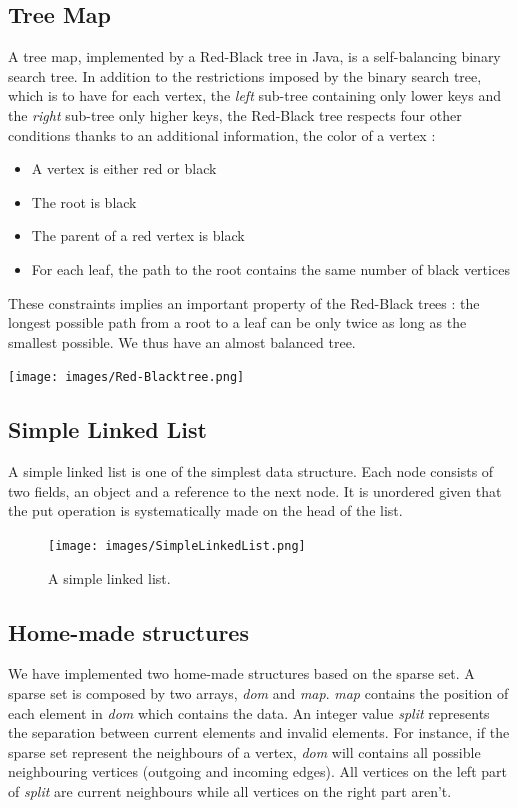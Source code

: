 \subsection{Tree Map}
A tree map, implemented by a Red-Black tree in Java, is a self-balancing binary search tree. In addition to the restrictions imposed by the binary search tree, which is to have for each vertex, the \textit{left} sub-tree containing only lower keys and the \textit{right} sub-tree only higher keys, the Red-Black tree respects four other conditions thanks to an additional information, the color of a vertex :

\begin{itemize}
\item A vertex is either red or black
\item The root is black
\item The parent of a red vertex is black
\item For each leaf, the path to the root contains the same number of black vertices
\end{itemize}

These constraints implies an important property of the Red-Black trees : the longest possible path from a root to a leaf can be only twice as long as the smallest possible. We thus have an almost balanced tree.

\begin{center}
\texttt{[image: images/Red-Blacktree.png]}
\end{center}

\subsection{Simple Linked List}
A simple linked list is one of the simplest data structure. Each node consists of two fields, an object and a reference to the next node. It is unordered given that the put operation is systematically made on the head of the list.

\begin{figure}[!h]
\texttt{[image: images/SimpleLinkedList.png]}
\caption{A simple linked list.}
\end{figure}
\newpage
\subsection{Home-made structures}
We have implemented two home-made structures based on the sparse set. A sparse set is composed by two arrays, \textit{dom} and \textit{map}. \textit{map} contains the position of each element in \textit{dom} which contains the data. An integer value \textit{split} represents the separation between current elements and invalid elements. For instance, if the sparse set represent the neighbours of a vertex, \textit{dom} will contains all possible neighbouring vertices (outgoing and incoming edges). All vertices on the left part of \textit{split} are current neighbours while all vertices on the right part aren't. \newline

